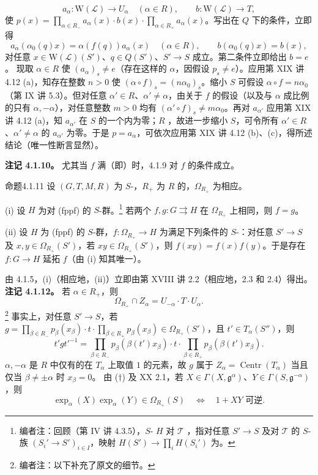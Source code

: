 \[a_\alpha:\mathrm W(\mathcal L)\to U_\alpha\quad(\alpha\in R),\qquad b:\mathrm W(\mathcal L)\to T,\]
使 $p(x)=\prod_{\alpha\in R_-}a_\alpha(x)\cdot b(x)\cdot\prod_{\alpha\in R_+}a_\alpha(x)$。写出在 $Q$ 下的条件，立即得
\[a_\alpha(\alpha_0(q)x)=\alpha(f(q))a_\alpha(x)\quad(\alpha\in R),\qquad b(\alpha_0(q)x)=b(x),\]
对任意 $x\in\mathrm W(\mathcal L)(S')$、$q\in Q(S')$、$S'\to S$ 成立。第二条件立即给出 $b=e$。
现取 $\alpha\in R$ 使 $(a_\alpha)_s\ne e$（存在这样的 $\alpha$，因假设 $p_s\ne e$）。应用第 XIX 讲 4.12 (a)，知存在整数 $n>0$ 使 $(\alpha\circ f)_s=(n\alpha_0)_s$。缩小 $S$ 可假设 $\alpha\circ f=n\alpha_0$（第 IX 讲 5.3）。但对任意 $\alpha'\in R$、$\alpha'\ne\alpha$，由关于 $f$ 的假设（以及与 $\alpha$ 成比例的只有 $\alpha,-\alpha$），对任意整数 $m>0$ 均有 $(\alpha'\circ f)_s\ne m\alpha_0$。再对 $a_{\alpha'}$ 应用第 XIX 讲 4.12 (a)，知 $a_{\alpha'}$ 在 $S$ 的一个内为零；$R$ ，故进一步缩小 $S$，可令所有 $\alpha'\in R$、$\alpha'\ne\alpha$ 的 $a_{\alpha'}$ 为零。于是 $p=a_\alpha$，可依次应用第 XIX 讲 4.12 (b)、(c)，得所述结论（唯一性断言显然）。

\textbf{注记 4.1.10。} 尤其当 $f$ 满（即）时，4.1.9 对 $f$ 的条件成立。
\begin{SGAresult}{命题}{4.1.11} 设 $(G,T,M,R)$ 为 $S$-，$R_+$ 为 $R$ 的，$\Omega_{R_+}$ 为相应。

(i) 设 $H$ 为对 (fppf) 的 $S$-群。\footnote{编者注：回顾（第 IV 讲 4.3.5），$S$- $H$ 对 $\mathcal T$ ，指对任意 $S'\to S$ 及对 $\mathcal T$ 的 $S$-族 $(S_i'\to S')_{i\in I}$，映射 $H(S')\to\prod_i H(S_i')$ 为。} 若两个 $f,g:G\rightrightarrows H$ 在 $\Omega_{R_+}$ 上相同，则 $f=g$。

(ii) 设 $H$ 为 (fppf) 的 $S$-群，$f:\Omega_{R_+}\to H$ 为满足下列条件的 $S$-：对任意 $S'\to S$ 及 $x,y\in\Omega_{R_+}(S')$，若 $xy\in\Omega_{R_+}(S')$，则 $f(xy)=f(x)f(y)$。于是存在 $f:G\to H$ 延拓 $f$（由 (i) 知其唯一）。\end{SGAresult}
由 4.1.5，(i)（相应地，(ii)）立即由第 XVIII 讲 2.2（相应地，2.3 和 2.4）得出。
\textbf{注记 4.1.12。} 若 $\alpha\in R_+$，则
\[\Omega_{R_+}\cap Z_\alpha=U_{-\alpha}\cdot T\cdot U_\alpha.\tag{$\dagger$}\]
\footnote{编者注：以下补充了原文的细节。} 事实上，对任意 $S'\to S$，若 $g=\prod_{\beta\in R_-}p_\beta(x_\beta)\cdot t\cdot\prod_{\beta\in R_+}p_\beta(x_\beta)\in\Omega_{R_+}(S')$，且 $t'\in T_\alpha(S'')$，则
\[t'gt'^{-1}=\prod_{\beta\in R_-}p_\beta(\beta(t')x_\beta)\cdot t\cdot\prod_{\beta\in R_+}p_\beta(\beta(t')x_\beta).\]
$\alpha,-\alpha$ 是 $R$ 中仅有的在 $T_\alpha$ 上取值 $1$ 的元素，故 $g$ 属于 $Z_\alpha=\operatorname{Centr}(T_\alpha)$ 当且仅当 $\beta\ne\pm\alpha$ 时 $x_\beta=0$。
由 ($\dagger$) 及 XX 2.1，若 $X\in\Gamma(X,\mathfrak g^\alpha)$、$Y\in\Gamma(S,\mathfrak g^{-\alpha})$，则
\[\exp_\alpha(X)\exp_\alpha(Y)\in\Omega_{R_+}(S)\quad\Longleftrightarrow\quad1+XY\text{ 可逆}.\]

